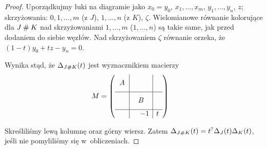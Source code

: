 \begin{proof}
\begin{comment}
        \strand[semithick] (30, 5) .. controls (22, 5) and (18, -5) .. (10, -5);
        \strand[semithick] (30,-5) .. controls (22, -5) and (18, 5) .. (10,  5);
        \strand[semithick] (10, 5) to (-10, 5);
        \strand[semithick,-Latex] (10, -5) to (-10, -5);

        \node[darkblue] at (-50,5) {$x_1,\ldots,x_{m-1}$};
        \node[red] at (-50,-5) {$1,\ldots,m$};

        \node[darkblue] at (50,5) {$y_1,\ldots,y_{n-1}$};
        \node[red] at (50,-5) {$1,\ldots,n$};

        \node[darkblue] at (-30,-5)[below right] {$x_m$};
        \node[darkblue] at (0,-5)[below] {$x_0 = y_0$};
        \node[darkblue] at (0, 5)[above] {$z$};
        \node[darkblue] at (30,-5)[below left] {$y_n$};
        \node[red] at ( 19.5,  1)[above]{$\zeta$};
        \node[red] at (-19.5,  1)[above]{$0$};
    \end{knot}
    \end{tikzpicture}\]
\end{comment}

    Uporządkujmy łuki na diagramie jako $x_0 = y_0$, $x_1, \ldots, x_m$, $y_1, \ldots, y_n$, $z$; skrzyżowania: $0, 1, \ldots, m$ (z $J$), $1, \ldots, n$ (z $K$), $\zeta$.
    Wielomianowe równanie kolorujące dla $J \mathbin{\#} K$ nad skrzyżowaniami $1, \ldots, m$ ($1, \ldots, n$) są takie same, jak przed dodaniem do siebie węzłów.
    Nad skrzyżowaniem $\zeta$ równanie orzeka, że $(1-t)y_0+t z-y_n=0$.

    Wynika stąd, że $\Delta_{J \mathbin{\#} K}(t)$ jest wyznacznikiem macierzy
    \begin{align*}
        M &= \left(\begin{array}{cc|cc|c}
            & & & & \\
            \multicolumn{2}{c|}{\smash{\raisebox{.5\normalbaselineskip}{$A$}}} & & \\
            \hline \\[-\normalbaselineskip]
            & & & & \\
            & & \multicolumn{2}{c|}{\smash{\raisebox{.5\normalbaselineskip}{$B$}}}\\ \hline
            & & & -1 & t
    \end{array}\right)
    \end{align*}

    Skreśliliśmy lewą kolumnę oraz górny wiersz.
    Zatem $\Delta_{J \mathbin{\#} K}(t) = t^?\Delta_J(t) \Delta_K(t)$, jeśli nie pomyliliśmy się w~obliczeniach.
\end{proof}

